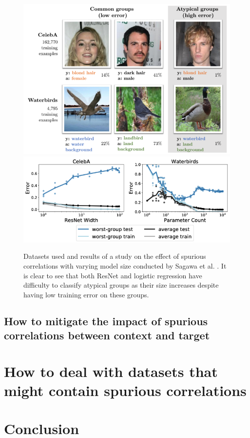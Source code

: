 \documentclass{article}
\begin{document}
\begin{figure}
    \centering
    \includegraphics[scale=0.2]{sagawa_dataset.png}
    \includegraphics[scale=0.28]{sagawa_diagram_standard.png}
    \caption{Datasets used and results of a study on the effect of spurious correlations with varying model size conducted by Sagawa et al. \cite{pmlr-v119-sagawa20a}. It is clear to see that both ResNet and logistic regression have difficulty to classify atypical groups as their size increases despite having low training error on these groups.}
    \label{fig:sagawaImg}
\end{figure}

\subsection{How to mitigate the impact of spurious correlations between context and target}


\section{How to deal with datasets that might contain spurious correlations}

\section{Conclusion}

\printbibliography
\end{document}
